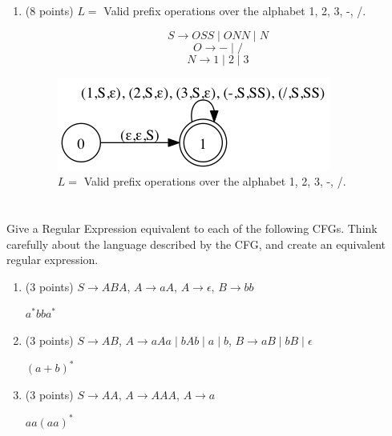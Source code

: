 \documentclass[paper=a4, fontsize=11pt]{scrartcl} %
\begin{document}
\begin{enumerate}
\item
  \begin{fancyquotes}
    (8 points) $L =$ Valid prefix operations over the alphabet 1, 2,
    3, -, /.
  \end{fancyquotes}

  $$S\rightarrow OSS \mid ONN \mid N$$
  $$O\rightarrow - \mid /$$
  $$N\rightarrow 1 \mid 2 \mid 3$$

  \begin{figure}[H]
    \centering
    \includegraphics[scale=.7]{5-1.gv.4.png}
    \caption{$L =$ Valid prefix operations over the alphabet 1, 2, 3, -, /.}
  \end{figure}

\end{enumerate}

\pagebreak

\section{}

\begin{fancyquotes}
  Give a Regular Expression equivalent to each of the following
  CFGs. Think carefully about the language described by the CFG, and
  create an equivalent regular expression.
\end{fancyquotes}

\begin{enumerate}
\item
  \begin{fancyquotes}
    (3 points) $S \rightarrow ABA$, $A \rightarrow aA$,
    $A \rightarrow \epsilon$, $B \rightarrow bb$
  \end{fancyquotes}

  $a^*bba^*$
\item
  \begin{fancyquotes}
    (3 points) $S \rightarrow AB$, $A \rightarrow aAa \mid bAb \mid a
    \mid b$, $B \rightarrow aB \mid bB \mid \epsilon$
  \end{fancyquotes}

  $(a+b)^*$
\item
  \begin{fancyquotes}
    (3 points) $S \rightarrow AA$, $A \rightarrow AAA$, $A \rightarrow a$
  \end{fancyquotes}

  $aa(aa)^*$
\end{enumerate}
\end{document}

